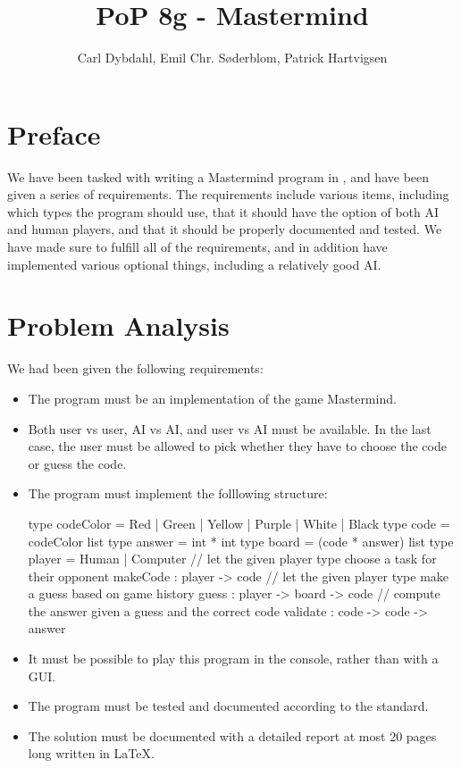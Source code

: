\documentclass[a4paper]{article}
\title{PoP 8g - Mastermind}
\author{Carl Dybdahl, Emil Chr. Søderblom, Patrick Hartvigsen}
\begin{document}
\maketitle

\section{Preface}

\noindent We have been tasked with writing a Mastermind program in \Fsh, and have been given a series of requirements. The requirements include various items, including which types the program should use, that it should have the option of both AI and human players, and that it should be properly documented and tested. We have made sure to fulfill all of the requirements, and in addition have implemented various optional things, including a relatively good AI.

\clearpage

\section{Problem Analysis}

We had been given the following requirements:

\begin{itemize}
\item The program must be an implementation of the game Mastermind.
\item Both user vs user, AI vs AI, and user vs AI must be available. In the last case, the user must be allowed to pick whether they have to choose the code or guess the code.
\item The program must implement the folllowing structure:
\begin{Code}
type codeColor =
  Red | Green | Yellow | Purple | White | Black
type code = codeColor list
type answer = int * int
type board = (code * answer) list
type player = Human | Computer
// let the given player type choose a task for their opponent
makeCode : player -> code
// let the given player type make a guess based on game history
guess : player -> board -> code
// compute the answer given a guess and the correct code
validate : code -> code -> answer
\end{Code}
\item It must be possible to play this program in the console, rather than with a GUI.
\item The program must be tested and documented according to the \Fsh standard.
\item The solution must be documented with a detailed report at most 20 pages long written in \LaTeX.
\end{itemize}
\end{document}
